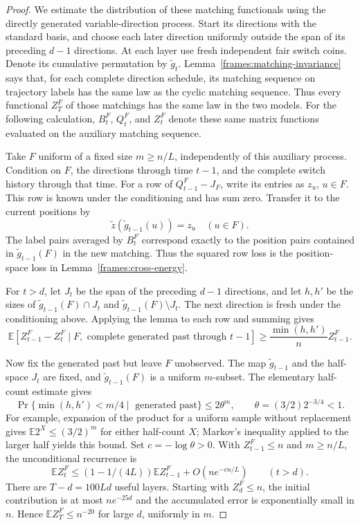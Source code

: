 \begin{proof}
We estimate the distribution of these matching functionals using the
directly generated variable-direction process. Start its directions
with the standard basis, and choose each later direction uniformly
outside the span of its preceding $d-1$ directions. At each layer use
fresh independent fair switch coins. Denote its cumulative
permutation by $\widetilde g_t$. Lemma~\ref{frames:matching-invariance} says that,
for each complete direction schedule, its matching sequence on trajectory
labels has the same law as the cyclic matching sequence. Thus every
functional $Z_T^F$ of those matchings has the same law in the two models.
For the following calculation, $B_t^F$, $Q_t^F$, and $Z_t^F$ denote
these same matrix functions evaluated on the auxiliary matching sequence.

Take $F$ uniform of a fixed size $m\ge n/L$, independently of this
auxiliary process. Condition on $F$, the directions through time $t-1$,
and the complete switch history through that time. For a row of
$Q_{t-1}^F-J_F$, write its entries as $z_u$, $u\in F$. This row is
known under the conditioning and has sum zero. Transfer it to the current
positions by
\[
 \widetilde z(\widetilde g_{t-1}(u))=z_u\quad(u\in F).
\]
The label pairs averaged by $B_t^F$ correspond exactly to the position
pairs contained in $\widetilde g_{t-1}(F)$ in the new matching. Thus the squared
row loss is the position-space loss in Lemma~\ref{frames:cross-energy}.

For $t>d$, let $J_t$ be the span of the preceding $d-1$ directions,
and let $h,h'$ be the sizes of
$\widetilde g_{t-1}(F)\cap J_t$ and $\widetilde g_{t-1}(F)\setminus J_t$. The next direction
is fresh under the conditioning above. Applying the lemma to each row
and summing gives
\[
 \mathbb E[Z_{t-1}^F-Z_t^F\mid
       F,\text{ complete generated past through }t-1]
 \ge\frac{\min(h,h')}{n}Z_{t-1}^F.
\]

Now fix the generated past but leave $F$ unobserved. The map $\widetilde g_{t-1}$
and the half-space $J_t$ are fixed, and $\widetilde g_{t-1}(F)$ is a uniform
$m$-subset. The elementary half-count estimate gives
\[
 \Pr\{\min(h,h')<m/4\mid\text{ generated past}\}
 \le 2\theta^m,
 \qquad \theta=(3/2)2^{-3/4}<1.
\]
For example, expansion of the product for a uniform sample without
replacement gives $\mathbb E2^X\le(3/2)^m$ for either half-count $X$;
Markov's inequality applied to the larger half yields this bound.
Set $c=-\log\theta>0$. With $Z_{t-1}^F\le n$ and $m\ge n/L$, the unconditional recurrence is
\[
 \mathbb E Z_t^F\le(1-1/(4L))\mathbb E Z_{t-1}^F
                         +O(ne^{-cn/L})\qquad(t>d).
\]
There are $T-d=100Ld$ useful layers. Starting with $Z_d^F\le n$,
the initial contribution is at most $ne^{-25d}$ and the accumulated
error is exponentially small in $n$. Hence
$\mathbb E Z_T^F\le n^{-20}$ for large $d$, uniformly in $m$.


\end{proof}
